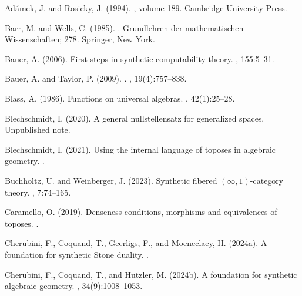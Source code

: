 \documentclass{msc}
\theoremstyle{theormstyle}
\theoremstyle{remarkstyle}
\begin{document}


\begin{thebibliography}{}

Ad{\'a}mek, J. and Rosicky, J. (1994).
, volume 189.
\newblock Cambridge University Press.

Barr, M. and Wells, C. (1985).
.
\newblock Grundlehren der mathematischen Wissenschaften; 278. Springer, New York.

Bauer, A. (2006).
\newblock First steps in synthetic computability theory.
, 155:5--31.

Bauer, A. and Taylor, P. (2009).
.
, 19(4):757--838.

Blass, A. (1986).
\newblock Functions on universal algebras.
, 42(1):25--28.

Blechschmidt, I. (2020).
\newblock A general nullstellensatz for generalized spaces.
\newblock Unpublished note.

Blechschmidt, I. (2021).
\newblock Using the internal language of toposes in algebraic geometry.
.

Buchholtz, U. and Weinberger, J. (2023).
\newblock Synthetic fibered $(\infty, 1)$-category theory.
, 7:74--165.

Caramello, O. (2019).
\newblock Denseness conditions, morphisms and equivalences of toposes.
.

Cherubini, F., Coquand, T., Geerligs, F., and Moeneclaey, H. (2024a).
\newblock A foundation for synthetic {Stone} duality.
.

Cherubini, F., Coquand, T., and Hutzler, M. (2024b).
\newblock A foundation for synthetic algebraic geometry.
, 34(9):1008--1053.


\end{thebibliography}
\end{document}
